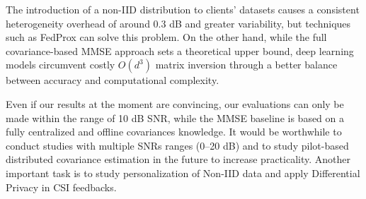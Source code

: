 \documentclass{llncs}
\begin{document}
The introduction of a non-IID distribution to clients' datasets causes a consistent heterogeneity overhead of around 0.3 dB and greater variability, but techniques such as FedProx can solve this problem. On the other hand, while
the full covariance-based MMSE approach sets a theoretical upper bound, deep learning models circumvent costly $O(d^3)$ matrix inversion through a better balance between accuracy and computational complexity.


Even if our results at the moment are convincing, our evaluations can only be made within the range of 10 dB SNR, while the MMSE baseline is based on a fully centralized and offline covariances knowledge. It would be worthwhile to conduct studies with multiple SNRs ranges (0–20 dB) and to study pilot-based distributed covariance estimation in the future to increase practicality. Another important task is to study personalization of Non-IID data and apply Differential Privacy in CSI feedbacks.



\end{document}

